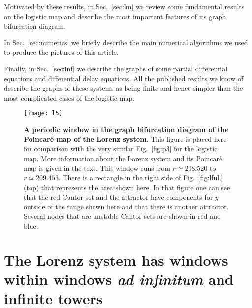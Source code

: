 \documentclass{article}
\def\rhoo{r}
\newcommand{\allblack}{\color{black}{}}
\newcommand{\jim}{\color{black} }
\begin{document}
Motivated by these results, in Sec.~\ref{sec:lm} we review some fundamental results on the logistic map and describe the most important features of its graph bifurcation diagram.

{\jim
In Sec.~\ref{sec:numerics} we briefly describe the main numerical algorithms we used to produce the pictures of this article. 
}

Finally, in Sec.~\ref{sec:inf} we describe the graphs of some partial differential equations and differential delay equations. 
All the published results we know of describe the graphs of these systems as being finite and hence simpler than the most complicated cases of the logistic map.


\allblack
%
\begin{figure}
 \centering
 \texttt{[image: l5]}
 \caption{{\bf A periodic window in the graph bifurcation diagram of the Poincar\'e map of the Lorenz system}.
 This figure is placed here for comparison with the very similar Fig.~\ref{fig:p3} for the logistic map. 
 More information about the Lorenz system and its Poincar\'e map is given in the text.
 This window runs from $\rhoo\simeq208.520$ to $\rhoo\simeq209.453$. 
 There is a rectangle in the right side of Fig.~\ref{fig:lfull}(top) that represents the area shown here. 
 In that figure one can see that the red Cantor set and the attractor have components for $y$ outside of the range shown here and that there is another attractor. 
 Several nodes that are unstable Cantor sets are shown in red and blue. 
}
 \label{fig:lcr}
\end{figure} 

\section{The Lorenz system has windows within windows \textit{\textbf{ad infinitum}} {\jim and infinite towers}}
\label{sec:Lorenz}
\end{document}
